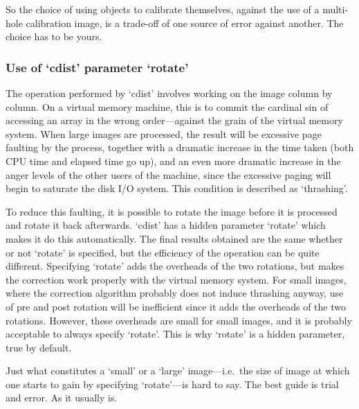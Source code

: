 \documentclass[11pt,twoside]{article}
\newcommand{\latorhtm}[2]{#1}
\newcommand{\latorhtm}[2]{#2}
\begin{document}
   So the choice of using objects to calibrate themselves, against the
   use of a multi-hole calibration image, is a trade-off of one source
   of error against another.  The choice has to be yours.


\subsubsection{\label{techno7cdist}Use of `cdist' parameter `rotate'}

   The operation performed by `cdist' involves working on the image
   column by column.  On a virtual memory machine, this is to commit the
   cardinal sin of accessing an array in the wrong
   order\latorhtm{---}{-}against the
   grain of the virtual memory system.  When large images are processed,
   the result will be excessive page faulting by the process, together
   with a dramatic increase in the time taken (both CPU time and elapsed
   time go up), and an even more dramatic increase in the anger levels
   of the other users of the machine, since the excessive paging will
   begin to saturate the disk I/O system.  This condition is described
   as `thrashing'.

   To reduce this faulting, it is possible to rotate the image before it
   is processed and rotate it back afterwards.  `cdist' has a hidden
   parameter `rotate' which makes it do this automatically.  The final
   results obtained are the same whether or not `rotate' is specified,
   but the efficiency of the operation can be quite different.
   Specifying `rotate' adds the overheads of the two rotations, but
   makes the correction work properly with the virtual memory system.
   For small images, where the correction algorithm probably does not
   induce thrashing anyway, use of pre and post rotation will be
   inefficient since it adds the overheads of the two rotations.
   However, these overheads are small for small images, and it is
   probably acceptable to always specify `rotate'.  This is why `rotate'
   is a hidden parameter, true by default.

   Just what constitutes a `small' or a `large'
   image\latorhtm{---}{-}i.e.\ the size of
   image at which one starts to gain by specifying
   `rotate'\latorhtm{---}{-}is hard to
   say.  The best guide is trial and error.  As it usually is.

\end{document}
